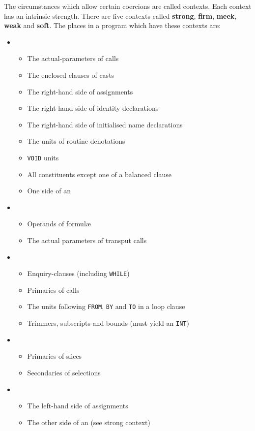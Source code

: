 The circumstances which allow certain coercions are called
contexts. Each context has an intrinsic strength. There are five
contexts called \textbf{strong}, \textbf{firm}, \textbf{meek},
\textbf{weak} and \textbf{soft}. The places in a program which have
these contexts are:
\begin{itemize}
\item {}
\begin{itemize}
\item The actual-parameters of calls
\item The enclosed clauses of casts
\item The right-hand side of assignments
\item The right-hand side of identity declarations
\item The right-hand side of initialised name declarations
\item The units of routine denotations
\item \verb|VOID| units
\item All constituents except one of a balanced clause
\item One side of an 
\end{itemize}
\item {}
\begin{itemize}
\item Operands of formul\ae{}
\item The actual parameters of transput calls
\end{itemize}
\item {}
\begin{itemize}
\item Enquiry-clauses (including \verb|WHILE|)
\item Primaries of calls
\item The units following \verb|FROM|, \verb|BY| and \verb|TO| in a
loop clause
\item Trimmers, subscripts and bounds (must yield an \verb|INT|)
\end{itemize}
\item {}
\begin{itemize}
\item Primaries of slices
\item Secondaries of selections
\end{itemize}
\item {}
\begin{itemize}
\item The left-hand side of assignments
\item The other side of an 
(see strong context)
\end{itemize}
\end{itemize}

